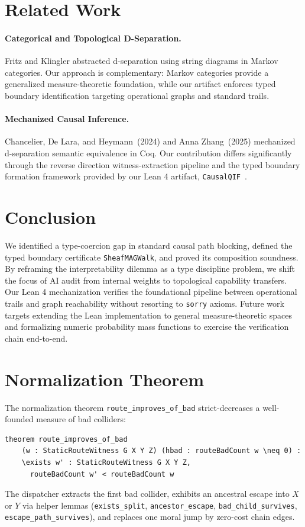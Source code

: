 \documentclass[acmsmall,screen,nonacm]{acmart}
\newcommand{\lean}[1]{\lstinline!#1!}
\begin{document}
\section{Related Work}\label{sec:related}
\paragraph{Categorical and Topological D-Separation.}
Fritz and Klingler \cite{fritz2023dseparation,fritz2023free} abstracted d-separation using string diagrams in Markov categories. Our approach is complementary: Markov categories provide a generalized measure-theoretic foundation, while our artifact enforces typed boundary identification targeting operational graphs and standard trails.

\paragraph{Mechanized Causal Inference.}
Chancelier, De Lara, and Heymann~(2024) \cite{chancelier2024conditional} and Anna Zhang~(2025) \cite{coqci2025} mechanized d-separation semantic equivalence in Coq. Our contribution differs significantly through the reverse direction witness-extraction pipeline and the typed boundary formation framework provided by our Lean 4 artifact, \lean{CausalQIF}~\cite{causalqif2026}.

\section{Conclusion}\label{sec:conclusion}
We identified a type-coercion gap in standard causal path blocking, defined the typed boundary certificate \lean{SheafMAGWalk}, and proved its composition soundness. By reframing the interpretability dilemma as a type discipline problem, we shift the focus of AI audit from internal weights to topological capability transfers. Our Lean 4 mechanization verifies the foundational pipeline between operational trails and graph reachability without resorting to \lean{sorry} axioms. Future work targets extending the Lean implementation to general measure-theoretic spaces and formalizing numeric probability mass functions to exercise the verification chain end-to-end.




\appendix
\section{Normalization Theorem}\label{app:normalization}
The normalization theorem \lean{route_improves_of_bad} strict-decreases a well-founded measure of bad colliders:
\begin{lstlisting}
theorem route_improves_of_bad
    (w : StaticRouteWitness G X Y Z) (hbad : routeBadCount w \neq 0) :
    \exists w' : StaticRouteWitness G X Y Z,
      routeBadCount w' < routeBadCount w
\end{lstlisting}
The dispatcher extracts the first bad collider, exhibits an ancestral escape into $X$ or $Y$ via helper lemmas (\lean{exists_split}, \lean{ancestor_escape}, \lean{bad_child_survives}, \lean{escape_path_survives}), and replaces one moral jump by zero-cost chain edges.
\end{document}
